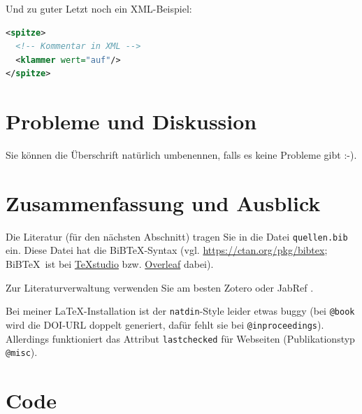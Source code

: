 \documentclass[12pt,oneside]{article}
\begin{document}
Und zu guter Letzt noch ein XML-Beispiel: 
\begin{lstlisting}[language=XML]
<spitze>
  <!-- Kommentar in XML -->
  <klammer wert="auf"/>
</spitze>
\end{lstlisting}


%
%

\section{Probleme und Diskussion}

Sie können die Überschrift natürlich umbenennen, falls es keine Probleme gibt :-).

%
%

\section{Zusammenfassung und Ausblick}

Die Literatur (für den nächsten Abschnitt) tragen Sie in die Datei \texttt{quellen.bib} ein. Diese Datei hat die BiB\TeX-Syntax (vgl. \url{https://ctan.org/pkg/bibtex}; BiB\TeX\ ist bei \href{https://www.heise.de/download/product/texstudio-62955}{\TeX studio} bzw. \href{https://www.overleaf.com}{Overleaf} dabei).

Zur Literaturverwaltung verwenden Sie am besten Zotero \cite{zotero} oder JabRef \cite{jabref}. 

Bei meiner \LaTeX-Installation ist der \texttt{natdin}-Style leider etwas buggy (bei \texttt{@book} wird die DOI-URL doppelt generiert, dafür fehlt sie bei \texttt{@inproceedings}). Allerdings funktioniert das
Attribut \texttt{lastchecked} für Webseiten (Publikationstyp \texttt{@misc}).


\appendix

\section{Code}


%
%

{}


  

\end{document}
